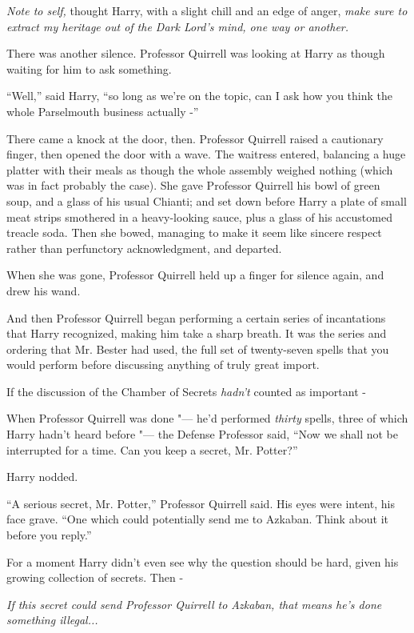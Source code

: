 \emph{Note to self,} thought Harry, with a slight chill and an edge of
anger, \emph{make sure to extract my heritage out of the Dark Lord's
mind, one way or another.}

There was another silence. Professor Quirrell was looking at Harry as
though waiting for him to ask something.

``Well,'' said Harry, ``so long as we're on the topic, can I ask how you
think the whole Parselmouth business actually -''

There came a knock at the door, then. Professor Quirrell raised a
cautionary finger, then opened the door with a wave. The waitress
entered, balancing a huge platter with their meals as though the whole
assembly weighed nothing (which was in fact probably the case). She gave
Professor Quirrell his bowl of green soup, and a glass of his usual
Chianti; and set down before Harry a plate of small meat strips
smothered in a heavy-looking sauce, plus a glass of his accustomed
treacle soda. Then she bowed, managing to make it seem like sincere
respect rather than perfunctory acknowledgment, and departed.

When she was gone, Professor Quirrell held up a finger for silence
again, and drew his wand.

And then Professor Quirrell began performing a certain series of
incantations that Harry recognized, making him take a sharp breath. It
was the series and ordering that Mr. Bester had used, the full set of
twenty-seven spells that you would perform before discussing anything of
truly great import.

If the discussion of the Chamber of Secrets \emph{hadn't} counted as
important -

When Professor Quirrell was done "--- he'd performed \emph{thirty} spells,
three of which Harry hadn't heard before "--- the Defense Professor said,
``Now we shall not be interrupted for a time. Can you keep a secret, Mr.
Potter?''

Harry nodded.

``A serious secret, Mr. Potter,'' Professor Quirrell said. His eyes were
intent, his face grave. ``One which could potentially send me to
Azkaban. Think about it before you reply.''

For a moment Harry didn't even see why the question should be hard,
given his growing collection of secrets. Then -

\emph{If this secret could send Professor Quirrell to Azkaban, that
means he's done something illegal...}

